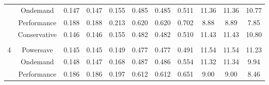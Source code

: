 \begin{table}[H]
\begin{tabular}{ccccccccccc}
\multicolumn{1}{c|}{}  & Ondemand                         & 0.147                     & 0.147                     & \multicolumn{1}{c|}{{\color[HTML]{FE0000} 0.155}} & 0.485                     & 0.485                     & \multicolumn{1}{c|}{{\color[HTML]{FE0000} 0.511}} & 11.36                     & 11.36                     & {\color[HTML]{FE0000} 10.77}                     \\
\multicolumn{1}{c|}{}  & Performance                      & 0.188                     & 0.188                     & \multicolumn{1}{c|}{{\color[HTML]{FE0000} 0.213}} & 0.620                     & 0.620                     & \multicolumn{1}{c|}{{\color[HTML]{FE0000} 0.702}} & 8.88                      & 8.89                      & {\color[HTML]{FE0000} 7.85}                      \\
\multicolumn{1}{l|}{}  & \multicolumn{1}{l}{Conservative} & \multicolumn{1}{l}{0.146} & \multicolumn{1}{l}{0.146} & \multicolumn{1}{l|}{{\color[HTML]{FE0000} 0.155}} & \multicolumn{1}{l}{0.482} & \multicolumn{1}{l}{0.482} & \multicolumn{1}{l|}{{\color[HTML]{FE0000} 0.510}} & \multicolumn{1}{l}{11.43} & \multicolumn{1}{l}{11.43} & \multicolumn{1}{l}{{\color[HTML]{FE0000} 10.80}} \\ \hline
\multicolumn{1}{l}{}   & \multicolumn{1}{l}{}             & \multicolumn{1}{l}{}      & \multicolumn{1}{l}{}      & \multicolumn{1}{l|}{{\color[HTML]{FE0000} }}      & \multicolumn{1}{l}{}      & \multicolumn{1}{l}{}      & \multicolumn{1}{l|}{{\color[HTML]{FE0000} }}      & \multicolumn{1}{l}{}      & \multicolumn{1}{l}{}      & \multicolumn{1}{l}{{\color[HTML]{FE0000} }}      \\
\multicolumn{1}{c|}{4} & Powersave                        & 0.145                     & 0.145                     & \multicolumn{1}{c|}{{\color[HTML]{FE0000} 0.149}} & 0.477                     & 0.477                     & \multicolumn{1}{c|}{{\color[HTML]{FE0000} 0.491}} & 11.54                     & 11.54                     & {\color[HTML]{FE0000} 11.23}                     \\
\multicolumn{1}{c|}{}  & Ondemand                         & 0.148                     & 0.147                     & \multicolumn{1}{c|}{{\color[HTML]{FE0000} 0.168}} & 0.487                     & 0.486                     & \multicolumn{1}{c|}{{\color[HTML]{FE0000} 0.554}} & 11.32                     & 11.34                     & {\color[HTML]{FE0000} 9.94}                      \\
\multicolumn{1}{c|}{}  & Performance                      & 0.186                     & 0.186                     & \multicolumn{1}{c|}{{\color[HTML]{FE0000} 0.197}} & 0.612                     & 0.612                     & \multicolumn{1}{c|}{{\color[HTML]{FE0000} 0.651}} & 9.00                      & 9.00                      & {\color[HTML]{FE0000} 8.46}                      \\

\end{tabular}
\end{table}
